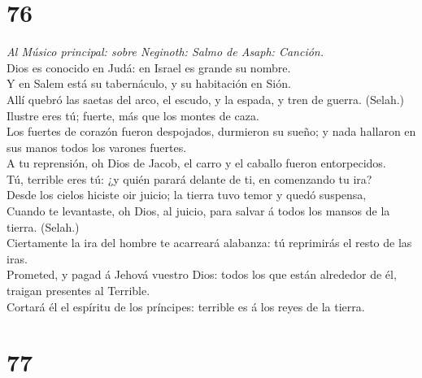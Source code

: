 \hypertarget{section-75}{%
\section{76}\label{section-75}}

 \emph{Al Músico principal: sobre Neginoth: Salmo de Asaph:
Canción.}\\
Dios es conocido en Judá: en Israel es grande su nombre.\\
 Y en Salem está su tabernáculo, y su habitación en Sión.\\
 Allí quebró las saetas del arco, el escudo, y la espada, y
tren de guerra. (Selah.)\\
 Ilustre eres tú; fuerte, más que los montes de caza.\\
 Los fuertes de corazón fueron despojados, durmieron su
sueño; y nada hallaron en sus manos todos los varones fuertes.\\
 A tu reprensión, oh Dios de Jacob, el carro y el caballo
fueron entorpecidos.\\
 Tú, terrible eres tú: ¿y quién parará delante de ti, en
comenzando tu ira?\\
 Desde los cielos hiciste oir juicio; la tierra tuvo temor y
quedó suspensa,\\
 Cuando te levantaste, oh Dios, al juicio, para salvar á
todos los mansos de la tierra. (Selah.)\\
 Ciertamente la ira del hombre te acarreará alabanza: tú
reprimirás el resto de las iras.\\
 Prometed, y pagad á Jehová vuestro Dios: todos los que
están alrededor de él, traigan presentes al Terrible.\\
 Cortará él el espíritu de los príncipes: terrible es á los
reyes de la tierra.

\hypertarget{section-76}{%
\section{77}\label{section-76}}

